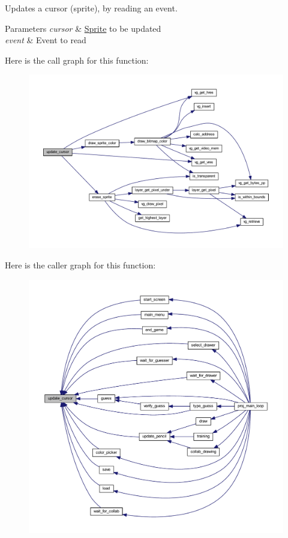 Updates a cursor (sprite), by reading an event. 


\begin{DoxyParams}{Parameters}
{\em cursor} & \mbox{\hyperlink{struct_sprite}{Sprite}} to be updated \\
\hline
{\em event} & Event to read \\
\hline
\end{DoxyParams}
Here is the call graph for this function\+:\nopagebreak
\begin{figure}[H]
\begin{center}
\leavevmode
\includegraphics[width=350pt]{group__sprite_ga90f5eec8870a027c011108bc4885880c_cgraph}
\end{center}
\end{figure}
Here is the caller graph for this function\+:\nopagebreak
\begin{figure}[H]
\begin{center}
\leavevmode
\includegraphics[width=350pt]{group__sprite_ga90f5eec8870a027c011108bc4885880c_icgraph}
\end{center}
\end{figure}
\mbox{\label{group__sprite_ga912de7c5bbbc103cb804e3bd76ba770a}} 
